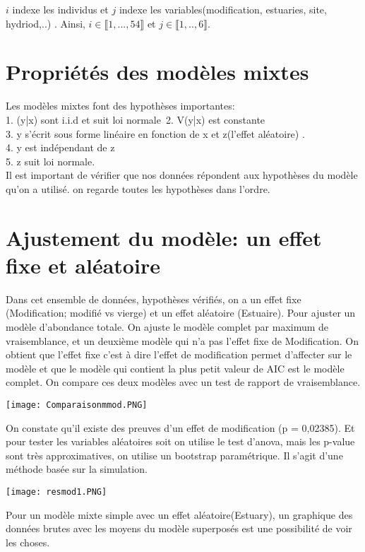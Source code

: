 \documentclass[10pt,a4paper,]{report}
\begin{document}
\begin{spacing}{1}
$ i $ indexe les individus et $ j $ indexe les variables(modification, estuaries, site, hydriod,..) . Ainsi, $ i \in  \llbracket 1 ,...,54 \rrbracket $ et $ j \in  \llbracket 1,..,6 \rrbracket . $


\section{Propriétés des modèles mixtes}
Les modèles mixtes font des hypothèses importantes:\\
1. (y|x) sont i.i.d et suit loi normale\
2. V(y|x) est constante\\
3. y s'écrit sous forme linéaire en fonction de x et z(l'effet aléatoire) .\\
4. y est indépendant de z\\
5. z suit loi normale.\\

Il est important de vérifier que nos données répondent aux hypothèses du modèle qu'on a utilisé. on regarde toutes les hypothèses dans l'ordre.
\section{Ajustement du modèle: un effet fixe et aléatoire}
Dans cet ensemble de données, hypothèses vérifiés, on a un effet fixe (Modification; modifié vs vierge) et un effet aléatoire (Estuaire). Pour ajuster un modèle d'abondance totale. On ajuste le modèle complet par maximum de vraisemblance, et un deuxième modèle qui n'a pas l'effet fixe de Modification. On obtient que l'effet fixe c'est à dire l'effet de modification permet d'affecter sur le modèle et que le modèle qui contient la plus petit valeur de AIC est le modèle complet. On compare ces deux modèles avec un test de rapport de vraisemblance.
\begin{center}
    \texttt{[image: Comparaisonmmod.PNG]}
\end{center}
On constate qu'il existe des preuves d'un effet de modification (p = 0,02385).
Et pour tester les variables aléatoires soit on utilise le test d'anova, mais les p-value sont très approximatives, on utilise un bootstrap paramétrique. Il s'agit d'une méthode basée sur la simulation.

\begin{center}
    \texttt{[image: resmod1.PNG]}
\end{center}
Pour un modèle mixte simple avec un effet aléatoire(Estuary), un graphique des données brutes avec les moyens du modèle superposés est une possibilité de voir les choses.


\end{spacing}
\end{document}
